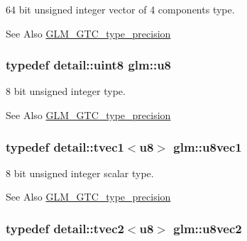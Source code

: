 64 bit unsigned integer vector of 4 components type. 

\begin{DoxySeeAlso}{See Also}
\hyperlink{group__gtc__type__precision}{G\-L\-M\-\_\-\-G\-T\-C\-\_\-type\-\_\-precision} 
\end{DoxySeeAlso}
\hypertarget{group__gtc__type__precision_ga5e3dc67373d5068997d2d9f41c9024d2}{
\subsubsection[{u8}]{\setlength{\rightskip}{0pt plus 5cm}typedef detail\-::uint8 {\bf glm\-::u8}}}\label{group__gtc__type__precision_ga5e3dc67373d5068997d2d9f41c9024d2}


8 bit unsigned integer type. 

\begin{DoxySeeAlso}{See Also}
\hyperlink{group__gtc__type__precision}{G\-L\-M\-\_\-\-G\-T\-C\-\_\-type\-\_\-precision} 
\end{DoxySeeAlso}
\hypertarget{group__gtc__type__precision_gac2309b4040a1432a8e1966b3a163b642}{
\subsubsection[{u8vec1}]{\setlength{\rightskip}{0pt plus 5cm}typedef detail\-::tvec1$<$u8$>$ {\bf glm\-::u8vec1}}}\label{group__gtc__type__precision_gac2309b4040a1432a8e1966b3a163b642}


8 bit unsigned integer scalar type. 

\begin{DoxySeeAlso}{See Also}
\hyperlink{group__gtc__type__precision}{G\-L\-M\-\_\-\-G\-T\-C\-\_\-type\-\_\-precision} 
\end{DoxySeeAlso}
\hypertarget{group__gtc__type__precision_gaa8ef8673b38c3442eb22bff54c5f0e00}{
\subsubsection[{u8vec2}]{\setlength{\rightskip}{0pt plus 5cm}typedef detail\-::tvec2$<$u8$>$ {\bf glm\-::u8vec2}}}\label{group__gtc__type__precision_gaa8ef8673b38c3442eb22bff54c5f0e00}


